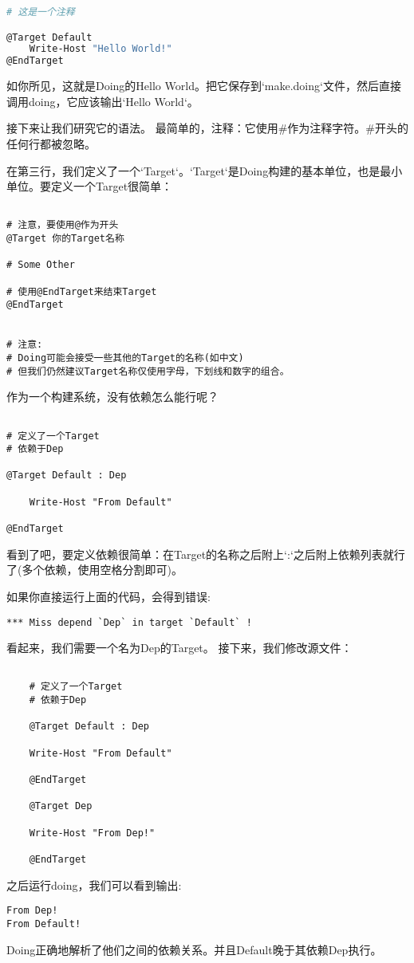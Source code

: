\begin{lstlisting}[language=bash]
# 这是一个注释

@Target Default
	Write-Host "Hello World!"
@EndTarget
\end{lstlisting}
如你所见，这就是Doing的Hello World。把它保存到`make.doing`文件，然后直接调用doing，它应该输出`Hello World`。\newline{}

接下来让我们研究它的语法。
最简单的，注释：它使用\#作为注释字符。\#开头的任何行都被忽略。\newline{}

在第三行，我们定义了一个`Target`。`Target`是Doing构建的基本单位，也是最小单位。要定义一个Target很简单：
\begin{lstlisting}

# 注意，要使用@作为开头
@Target 你的Target名称

# Some Other

# 使用@EndTarget来结束Target
@EndTarget


# 注意:
# Doing可能会接受一些其他的Target的名称(如中文)
# 但我们仍然建议Target名称仅使用字母，下划线和数字的组合。
\end{lstlisting}
作为一个构建系统，没有依赖怎么能行呢？
\begin{lstlisting}

# 定义了一个Target
# 依赖于Dep

@Target Default : Dep

	Write-Host "From Default"
	
@EndTarget
\end{lstlisting}
看到了吧，要定义依赖很简单：在Target的名称之后附上`:`之后附上依赖列表就行了(多个依赖，使用空格分割即可)。

如果你直接运行上面的代码，会得到错误:
\begin{lstlisting}
*** Miss depend `Dep` in target `Default` !
\end{lstlisting}
看起来，我们需要一个名为Dep的Target。\newline{}
接下来，我们修改源文件：
\begin{lstlisting}
	
	# 定义了一个Target
	# 依赖于Dep
	
	@Target Default : Dep
	
	Write-Host "From Default"
	
	@EndTarget
	
	@Target Dep
	
	Write-Host "From Dep!"
	
	@EndTarget
\end{lstlisting}
之后运行doing，我们可以看到输出:
\begin{lstlisting}
From Dep!
From Default!
\end{lstlisting}
Doing正确地解析了他们之间的依赖关系。并且Default晚于其依赖Dep执行。


